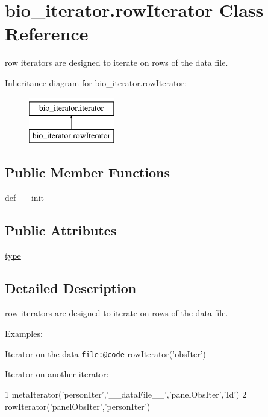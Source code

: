 \hypertarget{classbio__iterator_1_1row_iterator}{\section{bio\+\_\+iterator.\+row\+Iterator Class Reference}
\label{classbio__iterator_1_1row_iterator}
}


row iterators are designed to iterate on rows of the data file.  


Inheritance diagram for bio\+\_\+iterator.\+row\+Iterator\+:\begin{figure}[H]
\begin{center}
\leavevmode
\includegraphics[height=2.000000cm]{d7/dfb/classbio__iterator_1_1row_iterator}
\end{center}
\end{figure}
\subsection*{Public Member Functions}
\begin{DoxyCompactItemize}
\item 
def \hyperlink{classbio__iterator_1_1row_iterator_aa47088d10b947c713cb60678e14a8f9d}{\+\_\+\+\_\+init\+\_\+\+\_\+}
\end{DoxyCompactItemize}
\subsection*{Public Attributes}
\begin{DoxyCompactItemize}
\item 
\hyperlink{classbio__iterator_1_1row_iterator_a176ad0bad3c81c72fe75cd63929ec926}{type}
\end{DoxyCompactItemize}


\subsection{Detailed Description}
row iterators are designed to iterate on rows of the data file. 

Examples\+:
\begin{DoxyItemize}
\item Iterator on the data \href{file:@code}{\tt file\+:@code} \hyperlink{classbio__iterator_1_1row_iterator}{row\+Iterator}('obs\+Iter') 
\item Iterator on another iterator\+: 
\begin{DoxyCode}
1 metaIterator(\textcolor{stringliteral}{'personIter'},\textcolor{stringliteral}{'\_\_dataFile\_\_'},\textcolor{stringliteral}{'panelObsIter'},\textcolor{stringliteral}{'Id'})
2 rowIterator(\textcolor{stringliteral}{'panelObsIter'},\textcolor{stringliteral}{'personIter'})
\end{DoxyCode}
 
\end{DoxyItemize}

